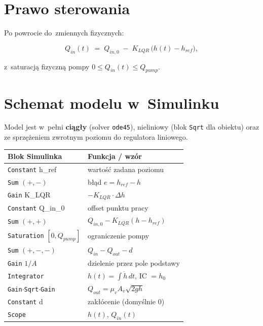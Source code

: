 \documentclass[11pt,a4paper]{article}
\begin{document}
\section{Prawo sterowania}

Po powrocie do~zmiennych fizycznych:
\begin{wzor}
\begin{equation}
\boxed{\;Q_{in}(t) \;=\; Q_{in,0} \;-\; K_{LQR}\,\big(h(t)-h_{ref}\big),\;}
\end{equation}
\end{wzor}
z~saturacją fizyczną pompy $0 \le Q_{in}(t) \le Q_{pump}$.

\section{Schemat modelu w~Simulinku}

Model jest w~pełni \textbf{ciągły} (solver \texttt{ode45}), nieliniowy
(blok \texttt{Sqrt} dla obiektu) oraz ze sprzężeniem zwrotnym poziomu do
regulatora liniowego.

\begin{center}
\begin{tabular}{@{}ll@{}}
\toprule
Blok Simulinka & Funkcja / wzór \\
\midrule
\texttt{Constant} \textsf{h\_ref}         & wartość zadana poziomu \\
\texttt{Sum} $(+,-)$                       & błąd $e = h_{ref}-h$ \\
\texttt{Gain} \textsf{K\_LQR}              & $-K_{LQR}\cdot\Delta h$ \\
\texttt{Constant} \textsf{Q\_in\_0}        & offset punktu pracy \\
\texttt{Sum} $(+,+)$                       & $Q_{in,0}-K_{LQR}(h-h_{ref})$ \\
\texttt{Saturation} $[0,Q_{pump}]$          & ograniczenie pompy \\
\texttt{Sum} $(+,-,-)$                     & $Q_{in}-Q_{out}-d$ \\
\texttt{Gain} $1/A$                        & dzielenie przez pole podstawy \\
\texttt{Integrator}                        & $h(t)=\int\dot h\,dt$, IC $=h_0$ \\
\texttt{Gain}$\cdot$\texttt{Sqrt}$\cdot$\texttt{Gain} & $Q_{out}=\mu_v A_v\sqrt{2gh}$ \\
\texttt{Constant} \textsf{d}               & zakłócenie (domyślnie 0) \\
\texttt{Scope}                             & $h(t)$, $Q_{in}(t)$ \\
\bottomrule
\end{tabular}
\end{center}
\end{document}
